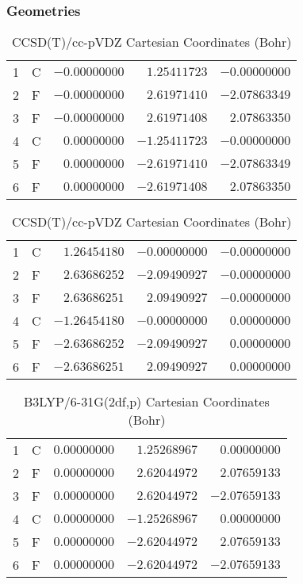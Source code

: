 \documentclass[10pt,oneside]{article}
\begin{document}
\begin{table}[h!]
\subsubsection*{Geometries}
\begin{multicols}{2}
\centering
\caption{CCSD(T)/cc-pVTZ Cartesian Coordinates (Bohr)}
\begin{tabular}{llrrr}
\toprule
1  & C  & $-0.00000000$ & $ 1.25411723$ & $-0.00000000$ \\
2  & F  & $-0.00000000$ & $ 2.61971410$ & $-2.07863349$ \\
3  & F  & $-0.00000000$ & $ 2.61971408$ & $ 2.07863350$ \\
4  & C  & $ 0.00000000$ & $-1.25411723$ & $-0.00000000$ \\
5  & F  & $ 0.00000000$ & $-2.61971410$ & $-2.07863349$ \\
6  & F  & $ 0.00000000$ & $-2.61971408$ & $ 2.07863350$ \\
\bottomrule
\end{tabular}
\caption{CCSD(T)/cc-pVDZ Cartesian Coordinates (Bohr)}
\begin{tabular}{llrrr}
\toprule
1  & C  & $ 1.26454180$ & $-0.00000000$ & $-0.00000000$ \\
2  & F  & $ 2.63686252$ & $-2.09490927$ & $-0.00000000$ \\
3  & F  & $ 2.63686251$ & $ 2.09490927$ & $-0.00000000$ \\
4  & C  & $-1.26454180$ & $-0.00000000$ & $ 0.00000000$ \\
5  & F  & $-2.63686252$ & $-2.09490927$ & $ 0.00000000$ \\
6  & F  & $-2.63686251$ & $ 2.09490927$ & $ 0.00000000$ \\
\bottomrule
\end{tabular}
\end{multicols}
\end{table}

\begin{table}[h]
\centering
\caption{B3LYP/6-31G(2df,p) Cartesian Coordinates (Bohr)}
\begin{tabular}{llrrr}
\toprule
1  & C  & $ 0.00000000$ & $ 1.25268967$ & $ 0.00000000$ \\
2  & F  & $ 0.00000000$ & $ 2.62044972$ & $ 2.07659133$ \\
3  & F  & $ 0.00000000$ & $ 2.62044972$ & $-2.07659133$ \\
4  & C  & $ 0.00000000$ & $-1.25268967$ & $ 0.00000000$ \\
5  & F  & $ 0.00000000$ & $-2.62044972$ & $ 2.07659133$ \\
6  & F  & $ 0.00000000$ & $-2.62044972$ & $-2.07659133$ \\
\bottomrule
\end{tabular}
\end{table}
\end{document}
